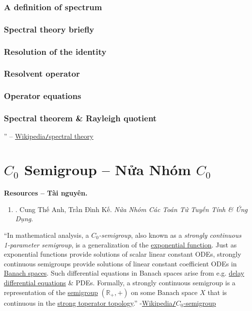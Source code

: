 \documentclass{article}
\begin{document}
\subsubsection{A definition of spectrum}

\subsubsection{Spectral theory briefly}

\subsubsection{Resolution of the identity}

\subsubsection{Resolvent operator}

\subsubsection{Operator equations}

\subsubsection{Spectral theorem \& Rayleigh quotient}

'' -- \href{https://en.wikipedia.org/wiki/Spectral_theory}{Wikipedia{\tt/}spectral theory}


\section{$C_0$ Semigroup -- Nửa Nhóm $C_0$}
\textbf{\textsf{Resources -- Tài nguyên.}}
\begin{enumerate}
	\item \cite{Anh_Ke_semigroup}. {\sc Cung Thế Anh, Trần Đình Kế}. {\it Nửa Nhóm Các Toán Tử Tuyến Tính \& Ứng Dụng}.
\end{enumerate}
``In mathematical analysis, a {\it $C_0$-semigroup}, also known as a {\it strongly continuous 1-parameter semigroup}, is a generalization of the \href{https://en.wikipedia.org/wiki/Exponential_function}{exponential function}. Just as exponential functions provide solutions of scalar linear constant ODEs, strongly continuous semigroups provide solutions of linear constant coefficient ODEs in \href{https://en.wikipedia.org/wiki/Banach_space}{Banach spaces}. Such differential equations in Banach spaces arise from e.g. \href{https://en.wikipedia.org/wiki/Delay_differential_equation}{delay differential equations} \& PDEs. Formally, a strongly continuous semigroup is a representation of the \href{https://en.wikipedia.org/wiki/Semigroup}{semigroup} $(\mathbb{R}_+,+)$ on some Banach space $X$ that is continuous in the \href{https://en.wikipedia.org/wiki/Strong_operator_topology}{strong toperator topology}.'' -\href{https://en.wikipedia.org/wiki/C0-semigroup}{Wikipedia{\tt/}$C_0$-semigroup}
\end{document}
